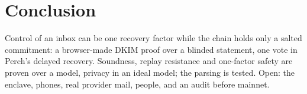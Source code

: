 \section{Conclusion}\label{sec:conclusion}

Control of an inbox can be one recovery factor while the chain holds only a
salted commitment: a browser-made DKIM proof over a blinded statement, one
vote in Perch's delayed recovery.
Soundness, replay resistance and one-factor safety are proven over a model,
privacy in an ideal model; the parsing is tested. Open: the enclave, phones,
real provider mail, people, and an audit before mainnet.

